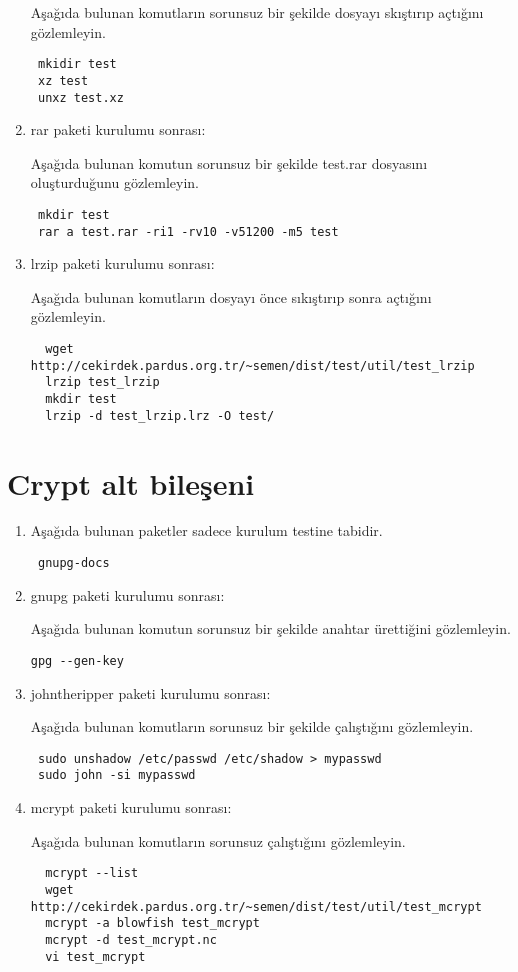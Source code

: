 \documentclass[a4paper,10pt]{article}
\begin{document}
\begin{enumerate}
Aşağıda bulunan komutların sorunsuz bir şekilde dosyayı skıştırıp açtığını gözlemleyin.
\begin{verbatim}
 mkidir test
 xz test
 unxz test.xz
\end{verbatim}


\item rar paketi kurulumu sonrası:

Aşağıda bulunan komutun sorunsuz bir şekilde test.rar dosyasını oluşturduğunu gözlemleyin.
\begin{verbatim}
 mkdir test
 rar a test.rar -ri1 -rv10 -v51200 -m5 test
\end{verbatim}


 \item lrzip paketi kurulumu sonrası:

Aşağıda bulunan komutların dosyayı önce sıkıştırıp sonra açtığını gözlemleyin.
\begin{verbatim}
  wget http://cekirdek.pardus.org.tr/~semen/dist/test/util/test_lrzip
  lrzip test_lrzip
  mkdir test
  lrzip -d test_lrzip.lrz -O test/
\end{verbatim}


\end{enumerate}


\section{Crypt alt bileşeni}
\begin{enumerate}
\item Aşağıda bulunan paketler sadece kurulum testine tabidir.

\begin{verbatim}
 gnupg-docs
\end{verbatim}

\item gnupg paketi kurulumu sonrası:

Aşağıda bulunan komutun sorunsuz bir şekilde anahtar ürettiğini gözlemleyin.
\begin{verbatim}
gpg --gen-key
\end{verbatim}

\item johntheripper paketi kurulumu sonrası:

Aşağıda bulunan komutların sorunsuz bir şekilde çalıştığını gözlemleyin.
\begin{verbatim}
 sudo unshadow /etc/passwd /etc/shadow > mypasswd
 sudo john -si mypasswd 
\end{verbatim}

 \item mcrypt paketi kurulumu sonrası:

Aşağıda bulunan komutların sorunsuz çalıştığını gözlemleyin.
\begin{verbatim}
  mcrypt --list
  wget http://cekirdek.pardus.org.tr/~semen/dist/test/util/test_mcrypt
  mcrypt -a blowfish test_mcrypt
  mcrypt -d test_mcrypt.nc
  vi test_mcrypt
\end{verbatim}


\end{enumerate}
\end{document}
